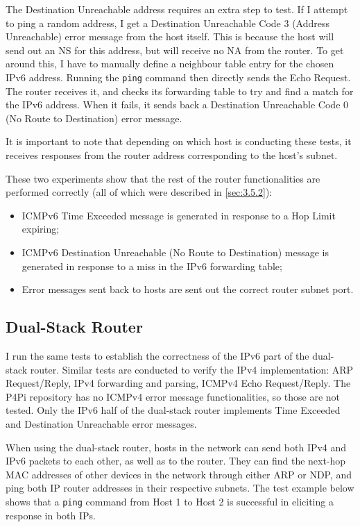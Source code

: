 The Destination Unreachable address requires an extra step to test. If I attempt to ping a random address, I get a Destination Unreachable Code 3 (Address Unreachable) error message from the host itself. This is because the host will send out an NS for this address, but will receive no NA from the router. To get around this, I have to manually define a neighbour table entry for the chosen IPv6 address. Running the \texttt{ping} command then directly sends the Echo Request. The router receives it, and checks its forwarding table to try and find a match for the IPv6 address. When it fails, it sends back a Destination Unreachable Code 0 (No Route to Destination) error message.

It is important to note that depending on which host is conducting these tests, it receives responses from the router address corresponding to the host's subnet. 

These two experiments show that the rest of the router functionalities are performed correctly (all of which were described in \cref{sec:3.5.2}):
\begin{itemize}[topsep=0pt]
\item ICMPv6 Time Exceeded message is generated in response to a Hop Limit expiring;
\item ICMPv6 Destination Unreachable (No Route to Destination) message is generated in response to a miss in the IPv6 forwarding table;
\item Error messages sent back to hosts are sent out the correct router subnet port.
\end{itemize}



\subsection{Dual-Stack Router}
\label{sec:4.1.2}

I run the same tests to establish the correctness of the IPv6 part of the dual-stack router. Similar tests are conducted to verify the IPv4 implementation: ARP Request/Reply, IPv4 forwarding and parsing, ICMPv4 Echo Request/Reply. The P4Pi repository has no ICMPv4 error message functionalities, so those are not tested. Only the IPv6 half of the dual-stack router implements Time Exceeded and Destination Unreachable error messages.

When using the dual-stack router, hosts in the network can send both IPv4 and IPv6 packets to each other, as well as to the router. They can find the next-hop MAC addresses of other devices in the network through either ARP or NDP, and ping both IP router addresses in their respective subnets. The test example below shows that a \texttt{ping} command from Host 1 to Host 2 is successful in eliciting a response in both IPs.

